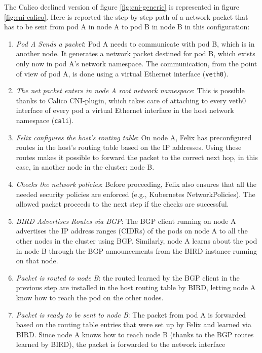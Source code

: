 The Calico declined version of figure \ref{fig:cni-generic} is represented in
figure \ref{fig:cni-calico}.
Here is reported the step-by-step path of a network packet that has to be sent
from pod A in node A to pod B in node B in this configuration:

\begin{enumerate}
  \item \textit{Pod A Sends a packet}: Pod A needs to communicate with pod B,
    which is in another node. It generates a network packet destined for pod B,
    which exists only now in pod A's network namespace. The communication, from
    the point of view of pod A, is done using a virtual Ethernet interface
    (\texttt{veth0}).
  \item \textit{The net packet enters in node A root network namespace}: This is
    possible thanks to Calico CNI-plugin, which takes care of attaching to every
    veth0 interface of every pod a virtual Ethernet interface in the host
    network namespace (\texttt{cali}).
  \item \textit{Felix configures the host's routing table}: On node A, Felix has
    preconfigured routes in the host's routing table based on the IP addresses.
    Using these routes makes it possible to forward the packet to the correct
    next hop, in this case, in another node in the cluster: node B.
  \item \textit{Checks the network policies}: Before proceeding, Felix also
    ensures that all the needed security policies are enforced (e.g., Kubernetes
    NetworkPolicies). The allowed packet proceeds to the next step if the checks
    are successful.
  \item \textit{BIRD Advertises Routes via BGP}: The BGP client running on node
    A advertises the IP address ranges (CIDRs) of the pods on node A to all the
    other nodes in the cluster using BGP. Similarly, node A learns about the pod
    in node B through the BGP announcements from the BIRD instance running on
    that node.
  \item \textit{Packet is routed to node B}: the routed learned by the BGP
    client in the previous step are installed in the host routing table by BIRD,
    letting node A know how to reach the pod on the other nodes.
  \item \textit{Packet is ready to be sent to node B}: The packet from pod A is
    forwarded based on the routing table entries that were set up by Felix and
    learned via BIRD. Since node A knows how to reach node B (thanks to the BGP
    routes learned by BIRD), the packet is forwarded to the network interface

\end{enumerate}
